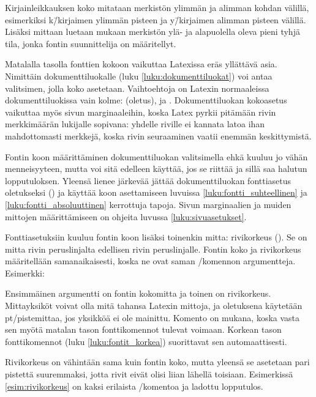 Kirjainleikkauksen koko mitataan merkistön ylimmän ja alimman kohdan
välillä, esimerkiksi k\=/kirjaimen ylimmän pisteen ja y\=/kirjaimen
alimman pisteen välillä. Lisäksi mittaan luetaan mukaan merkistön ylä-
ja alapuolella oleva pieni tyhjä tila, jonka fontin suunnittelija on
määritellyt.

Matalalla tasolla fonttien kokoon vaikuttaa Latexissa eräs yllättävä
asia. Nimittäin dokumenttiluokalle (luku \ref{luku:dokumenttiluokat})
voi antaa valitsimen, jolla koko asetetaan. Vaihtoehtoja on Latexin
normaaleissa dokumenttiluokissa vain kolme: \koodi{10pt} (oletus),
\koodi{11pt} ja \koodi{12pt}. Dokumenttiluokan koko\-asetus vaikuttaa
myös sivun marginaaleihin, koska Latex pyrkii pitämään rivin
merkkimäärän lukijalle sopivana: yhdelle riville ei kannata latoa ihan
mahdottomasti merkkejä, koska rivin seuraaminen vaatii enemmän
keskittymistä.

Fontin koon määrittäminen dokumenttiluokan valitsimella ehkä kuuluu jo
vähän menneisyyteen, mutta voi sitä edelleen käyttää, jos se riittää ja
sillä saa halutun lopputuloksen. Yleensä lienee järkevää jättää
dokumenttiluokan fonttiasetus oletukseksi (\koodi{10pt}) ja käyttää koon
asettamiseen luvuissa \ref{luku:fontti_suhteellinen} ja
\ref{luku:fontti_absoluuttinen} kerrottuja tapoja. Sivun marginaalien ja
muiden mittojen määrittämiseen on ohjeita luvussa
\ref{luku:sivuasetukset}.

Fonttiasetuksiin kuuluu fontin koon lisäksi toinenkin mitta: rivikorkeus
(). Se on mitta rivin peruslinjalta edellisen
rivin peruslinjalle. Fontin koko ja rivikorkeus määritellään
saman\-aikaisesti, koska ne ovat saman \-/komennon
argumentteja. Esimerkki:

\begin{koodilohkosis}
  \fontsize{10bp}{12bp} \selectfont
\end{koodilohkosis}

Ensimmäinen argumentti on fontin kokomitta ja toinen on rivikorkeus.
Mitta\-yksiköt voivat olla mitä tahansa Latexin mittoja, ja oletuksena
käytetään pt\-/pistemittaa, jos yksikköä ei ole mainittu. Komento
 on mukana, koska vasta sen myötä matalan
tason fonttikomennot tulevat voimaan. Korkean tason fonttikomennot (luku
\ref{luku:fontit_korkea}) suorittavat sen automaattisesti.

Rivikorkeus on vähintään sama kuin fontin koko, mutta yleensä se
asetetaan pari pistettä suuremmaksi, jotta rivit eivät olisi liian
lähellä toisiaan. Esimerkissä \ref{esim:rivikorkeus} on kaksi erilaista
\-/komentoa ja ladottu lopputulos.

